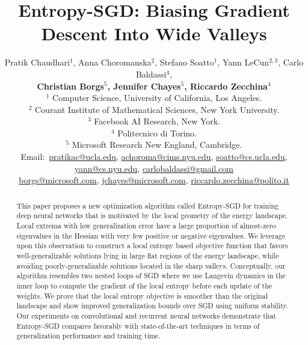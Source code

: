 \documentclass[10pt]{article}
\title{Entropy-SGD: Biasing Gradient Descent Into Wide Valleys}
\author{Pratik Chaudhari$^{1}$, Anna Choromanska$^{2}$, Stefano Soatto$^{1}$, Yann LeCun$^{2,3}$, Carlo Baldassi$^{4}$,\\[0.03in]
\textbf{Christian Borgs$^{5}$, Jennifer Chayes$^{5}$, 
Riccardo Zecchina$^{4}$}\\[0.05in]
$^{1}$ Computer Science, University of California, Los Angeles.\\
$^{2}$ Courant Institute of Mathematical Sciences, New York University.\\
$^{3}$ Facebook AI Research, New York.\\
$^{4}$ Politecnico di Torino.\\
$^{5}$ Microsoft Research New England, Cambridge.\\ [0.05in]
{\footnotesize
Email:\ \href{mailto:pratikac@ucla.edu}{pratikac@ucla.edu},
\href{mailto:achoroma@cims.nyu.edu}{achoroma@cims.nyu.edu},
\href{mailto:soatto@cs.ucla.edu}{soatto@cs.ucla.edu},
\href{mailto:yann@cs.nyu.edu}{yann@cs.nyu.edu},
\href{mailto:carlobaldassi@gmail.com}{carlobaldassi@gmail.com}}\\[0.03in]
{\footnotesize
\hspace{0.33in} \href{mailto:borgs@microsoft.com}{borgs@microsoft.com},
\href{mailto:jchayes@microsoft.com}{jchayes@microsoft.com},
\href{mailto:riccardo.zecchina@polito.it}{riccardo.zecchina@polito.it}
}}
\newcommand{\fix}[2]{{\color{blue}#1}\marginpar{\tiny\noindent{\raggedright{\color{blue}[FIX]}\color{blue}{#2} \par}}}
\begin{document}
\maketitle

\begin{abstract}
This paper proposes a new optimization algorithm called Entropy-SGD for training deep neural networks that is motivated by the local geometry of the energy landscape. Local extrema with low generalization error have a large proportion of almost-zero eigenvalues in the Hessian with very few positive or negative eigenvalues. We leverage upon this observation to construct a local entropy based objective function that favors well-generalizable solutions lying in large flat regions of the energy landscape, while avoiding poorly-generalizable solutions located in the sharp valleys. Conceptually, our algorithm resembles two nested loops of SGD where we use Langevin dynamics in the inner loop to compute the gradient of the local entropy before each update of the weights. \fix{We prove that the local entropy objective is smoother than the original landscape and show improved generalization bounds over SGD using uniform stability.}{smooth} Our experiments on convolutional and recurrent neural networks demonstrate that Entropy-SGD compares favorably with state-of-the-art techniques in terms of generalization performance and training time.
\end{abstract}
\end{document}

